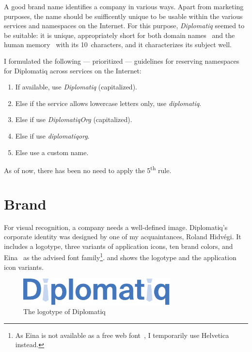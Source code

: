 A good brand name identifies a company in various ways. Apart from marketing purposes, the name should be suifficently unique to be usable within the various services and namespaces on the Internet. For this purpose, \emph{Diplomatiq} seemed to be suitable: it is unique, appropriately short for both domain names~\cite{howtochoosedomainname} and the human memory~\cite{memoryfour} with its 10~characters, and it characterizes its subject well.

I formulated the following — prioritized — guidelines for reserving namespaces for Diplomatiq across services on the Internet:

\begin{enumerate}
\item If available, use \emph{Diplomatiq} (capitalized).
\item Else if the service allows lowercase letters only, use \emph{diplomatiq}.
\item Else if use \emph{DiplomatiqOrg} (capitalized).
\item Else if use \emph{diplomatiqorg}.
\item Else use a custom name.
\end{enumerate}

As of now, there has been no need to apply the 5\textsuperscript{th} rule.

\section{Brand}

For visual recognition, a company needs a well-defined image. Diplomatiq's corporate identity was designed by one of my acquaintances, Roland Hidvégi. It includes a logotype, three variants of application icons, ten brand colors, and Eina~\cite{eina} as the advised font family\footnote{As Eina is not available as a free web font~\cite{eina-licensing}, I temporarily use Helvetica instead.}.  and  shows the logotype and the application icon variants.

\begin{figure}[!htb]
    \centering
    \vspace{2mm}
    \includegraphics[width=8cm]{figures/diplomatiq-logo.pdf}
    \caption{The logotype of Diplomatiq}
    \label{fig:diplomatiq-logotype}
\end{figure}

